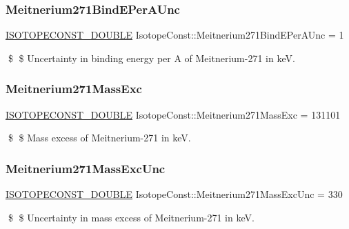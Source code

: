 \subsubsection{\texorpdfstring{Meitnerium271\+Bind\+E\+Per\+A\+Unc}{Meitnerium271BindEPerAUnc}}
{\footnotesize\ttfamily \mbox{\hyperlink{group___isotope_const-_macros_ga8f45a7272ce02c0b4c65c44636ed719a}{I\+S\+O\+T\+O\+P\+E\+C\+O\+N\+S\+T\+\_\+\+D\+O\+U\+B\+LE}} Isotope\+Const\+::\+Meitnerium271\+Bind\+E\+Per\+A\+Unc = 1}

\$ \$ Uncertainty in binding energy per A of Meitnerium-\/271 in keV. \mbox{\label{group___isotope_const-_meitnerium-_mt271_gabb30ffde2ec1dcb153eff243ec81fb1a}} 
\subsubsection{\texorpdfstring{Meitnerium271\+Mass\+Exc}{Meitnerium271MassExc}}
{\footnotesize\ttfamily \mbox{\hyperlink{group___isotope_const-_macros_ga8f45a7272ce02c0b4c65c44636ed719a}{I\+S\+O\+T\+O\+P\+E\+C\+O\+N\+S\+T\+\_\+\+D\+O\+U\+B\+LE}} Isotope\+Const\+::\+Meitnerium271\+Mass\+Exc = 131101}

\$ \$ Mass excess of Meitnerium-\/271 in keV. \mbox{\label{group___isotope_const-_meitnerium-_mt271_gaeb3e686b0f61ef48c438284ff5620b38}} 
\subsubsection{\texorpdfstring{Meitnerium271\+Mass\+Exc\+Unc}{Meitnerium271MassExcUnc}}
{\footnotesize\ttfamily \mbox{\hyperlink{group___isotope_const-_macros_ga8f45a7272ce02c0b4c65c44636ed719a}{I\+S\+O\+T\+O\+P\+E\+C\+O\+N\+S\+T\+\_\+\+D\+O\+U\+B\+LE}} Isotope\+Const\+::\+Meitnerium271\+Mass\+Exc\+Unc = 330}

\$ \$ Uncertainty in mass excess of Meitnerium-\/271 in keV. \mbox{\label{group___isotope_const-_meitnerium-_mt271_gad5737a236ddab7892fe8d92ce952f577}} 
